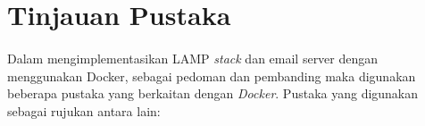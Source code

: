 \documentclass[./bab_2.tex]{subfiles}
\begin{document}
\section{Tinjauan Pustaka}
  \paragraph*{}Dalam mengimplementasikan LAMP \textit{stack}
  dan email server dengan menggunakan Docker, sebagai
  pedoman dan pembanding maka digunakan beberapa pustaka
  yang berkaitan dengan \textit{Docker}. Pustaka yang
  digunakan sebagai rujukan antara lain:

\end{document}
